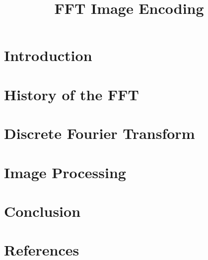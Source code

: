 \documentclass[sigplan]{acmart}
\title{FFT Image Encoding}
\begin{document}
  \maketitle

  \section{Introduction}
	

  \section{History of the FFT}
	

  \section{Discrete Fourier Transform}
	

  \section{Image Processing}
	

  \section{Conclusion}
	

  \section{References}
	
\end{document}
